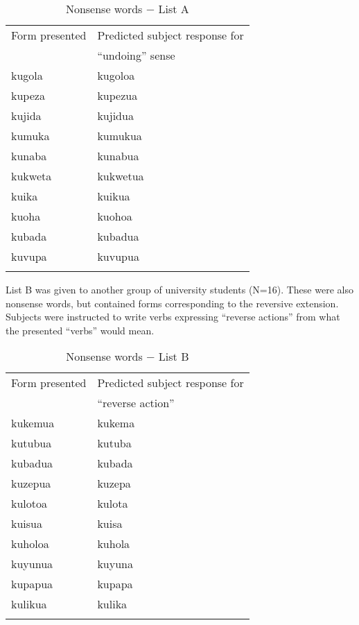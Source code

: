 \documentclass[output=paper]{langsci/langscibook}
\begin{document}
\begin{table}
\begin{tabularx}{\textwidth}{XX}
\lsptoprule
 Form presented &  Predicted subject response for \\
& “undoing” sense\\
\midrule
  {kugola} &  {kugoloa}\\
 {kupeza} &  {kupezua}\\
 {kujida} &  {kujidua}\\
 {kumuka} &  {kumukua}\\
 {kunaba} &  {kunabua}\\
 {kukweta} &  {kukwetua}\\ 
 {kuika} &  {kuikua}\\
  {kuoha} &  {kuohoa}\\
  {kubada} &  {kubadua}\\
  {kuvupa} &  {kuvupua}\\
\lspbottomrule
\end{tabularx}
\caption{Nonsense words $-$ List A}
\label{tab:ngonyaningowa:1}
\end{table}

List B  was given to another group of university students (N=16). These were also nonsense words, but contained forms corresponding to the reversive extension. Subjects were instructed to write verbs expressing “reverse actions” from what the presented “verbs” would mean.

\begin{table}
\begin{tabularx}{\textwidth}{XX}
\lsptoprule
Form presented & Predicted subject response for \\ & “reverse action”\\
\midrule
{kukemua} & {kukema}\\
{kutubua} & {kutuba}\\
{kubadua} & {kubada}\\
{kuzepua} & {kuzepa}\\
{kulotoa} & {kulota}\\
{kuisua} & {kuisa}\\
{kuholoa} & {kuhola}\\
{kuyunua} & {kuyuna}\\
{kupapua} & {kupapa}\\
{kulikua} & {kulika}\\
\lspbottomrule
\end{tabularx}
\caption{Nonsense words $-$ List B}
\label{tab:ngonyaningowa:2}
\end{table}
\end{document}
